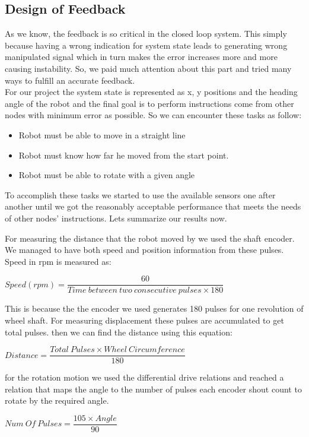 \documentclass[12pt]{article}
\begin{document}
\newpage
	\subsection{Design of Feedback}
	As we know, the feedback is so critical in the closed loop system. This simply because having a wrong indication for system state leads to generating wrong manipulated signal which in turn makes the error increases more and more causing instability. So, we paid much attention about this part and tried many ways to fulfill an accurate feedback. \\
	For our project the system state is represented as x, y positions and the heading angle of the robot and the final goal is to perform instructions come from other nodes with minimum error as possible. So we can encounter these tasks as follow:
	\begin{itemize}
		\item Robot must be able to move in a straight line
		\item Robot must know how far he moved from the start point.
		\item Robot must be able to rotate with a given angle
	\end{itemize}

	\noindent To accomplish these tasks we started to use the available sensors one after another until we got the reasonably acceptable performance that meets the needs of other nodes' instructions. Lets summarize our results now.
	
	\noindent For measuring the distance that the robot moved by we used the shaft encoder. We managed to have both speed and position information from these pulses. Speed in rpm is measured as:
	\begin{center}
		$ Speed (rpm) = \dfrac{60}{Time\ between\ two\ consecutive\ pulses \times 180} $
	\end{center}
	\noindent This is because the the encoder we used generates 180 pulses for one revolution of wheel shaft. For measuring displacement these pulses are accumulated to get total pulses. then we can find the distance using this equation:
	\begin{center}
		$ Distance = \dfrac{Total\ Pulses  \times Wheel\ Circumference}{180} $
	\end{center}
	
	\noindent for the rotation motion we used the differential drive relations and reached a relation that maps the angle to the number of pulses each encoder shout count to rotate by the required angle.
	\begin{center}
		$ Num\ Of\ Pulses = \dfrac{105 \times Angle}{90} $
	\end{center}
	
\end{document}
